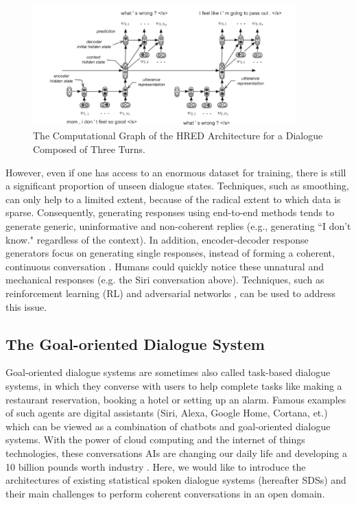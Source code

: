 \documentclass[bsc,frontabs,twoside,singlespacing,parskip,deptreport]{infthesis}     %
\begin{document}
\begin{figure}[h]
    \centering
    \includegraphics[width=0.9\textwidth]{HERD.jpeg}
    \caption{The Computational Graph of the HRED Architecture for a Dialogue Composed of Three Turns.}
    \label{fig:HERD}
\end{figure}

However, even if one has access to an enormous dataset for training, there is still a significant proportion of unseen dialogue states. Techniques, such as smoothing, can only help to a limited extent, because of the radical extent to which data is sparse. Consequently, generating responses using end-to-end methods tends to generate generic, uninformative and non-coherent replies (e.g., generating ``I don’t know." regardless of the context). In addition, encoder-decoder response generators focus on generating single responses, instead of forming a coherent, continuous conversation \cite{jurafsky2019speech}. Humans could quickly notice these unnatural and mechanical responses (e.g. the Siri conversation above). Techniques, such as reinforcement learning (RL) \cite{li2016deep} and adversarial networks \cite{li2017adversarial}, can be used to address this issue.

\subsection{The Goal-oriented Dialogue System}

 Goal-oriented dialogue systems are sometimes also called task-based dialogue systems, in which they converse with users to help complete tasks like making a restaurant reservation, booking a hotel or setting up an alarm. Famous examples of such agents are digital assistants (Siri, Alexa, Google Home, Cortana, et.) \cite{siri,alexa,googlehome,cortana} which can be viewed as a combination of chatbots and goal-oriented dialogue systems. With the power of cloud computing and the internet of things technologies, these conversations AIs are changing our daily life and developing a 10 billion pounds worth industry \cite{chatbotmarket}. Here, we would like to introduce the architectures of existing statistical spoken dialogue systems (hereafter SDSs) and their main challenges to perform coherent conversations in an open domain. 
\end{document}
